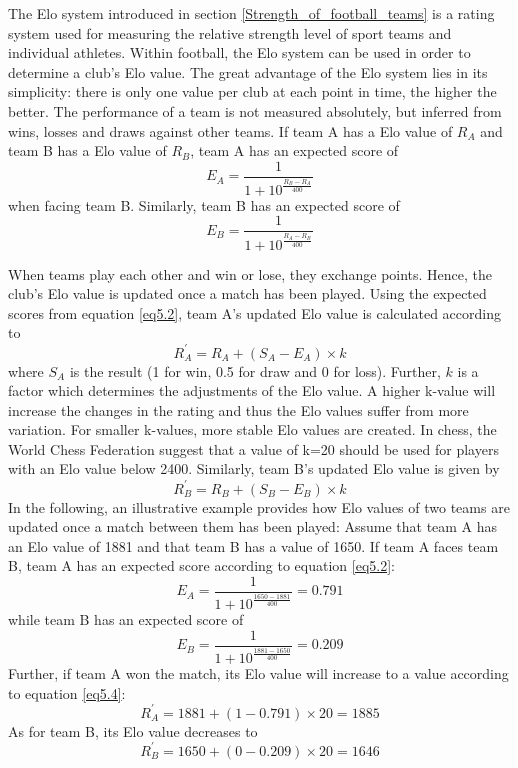 The Elo system introduced in section \ref{Strength_of_football_teams} is a rating system used for measuring the relative strength level of sport teams and individual athletes. Within football, the Elo system can be used in order to determine a club's Elo value. The great advantage of the Elo system lies in its simplicity: there is only one value per club at each point in time, the higher the better. 
\newpar
The performance of a team is not measured absolutely, but inferred from wins, losses and draws against other teams. If team A has a Elo value of $R_A$ and team B has a Elo value of $R_B$, team A has an expected score of 
\begin{equation}\label{eq5.2}
    E_A = \frac{1}{1+10^{\frac{R_B - R_A}{400}}}
\end{equation}
when facing team B. Similarly, team B has an expected score of
\begin{equation}\label{eq5.3}
    E_B = \frac{1}{1+10^{\frac{R_A - R_B}{400}}}
\end{equation}

\newpar
When teams play each other and win or lose, they exchange points. Hence, the club's Elo value is updated once a match has been played. Using the expected scores from equation \ref{eq5.2}, team A's updated Elo value is calculated according to
\begin{equation} \label{eq5.4}
    R^{'}_A = R_A + (S_A-E_A) \times k
\end{equation}
where $S_A$ is the result (1 for win, 0.5 for draw and 0 for loss). Further, $k$ is a factor which determines the adjustments of the Elo value. A higher k-value will increase the changes in the rating and thus the Elo values suffer from more variation. For smaller k-values, more stable Elo values are created. In chess, the World Chess Federation suggest that a value of k=20 should be used for players with an Elo value below 2400. 
\newpar
Similarly, team B's updated Elo value is given by
\begin{equation} \label{eq5.5}
    R^{'}_B = R_B + (S_B-E_B) \times k
\end{equation}
\newpar
In the following, an illustrative example provides how Elo values of two teams are updated once a match between them has been played:
\newpar
Assume that team A has an Elo value of 1881 and that team B has a value of 1650. If team A faces team B, team A has an expected score according to equation \ref{eq5.2}:
\begin{equation*}
    E_A = \frac{1}{1+10^{\frac{1650-1881}{400}}} = 0.791
\end{equation*}
while team B has an expected score of
\begin{equation*}
    E_B = \frac{1}{1+10^{\frac{1881-1650}{400}}} = 0.209
\end{equation*}
Further, if team A won the match, its Elo value will increase to a value according to equation \ref{eq5.4}: 
\begin{equation*}
   R^{'}_A= 1881 + (1-0.791) \times 20 = 1885
\end{equation*}
As for team B, its Elo value decreases to
\begin{equation*}
   R^{'}_B = 1650 + (0-0.209) \times 20 = 1646 
\end{equation*}

